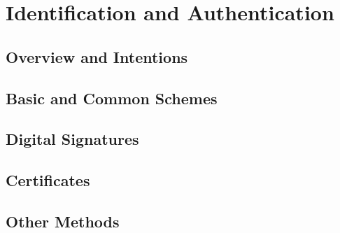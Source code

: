 
\chapter{Identification and Authentication} 
\label{Chapter5}

\section{Overview and Intentions}

\section{Basic and Common Schemes}

\section{Digital Signatures}

\section{Certificates}

\section{Other Methods}

